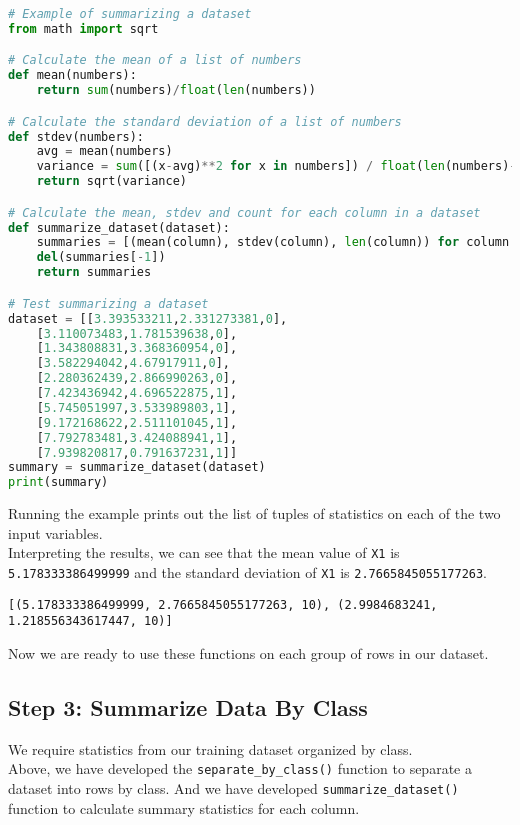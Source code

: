 \documentclass[12pt]{article}
\begin{document}
\begin{lstlisting}[language=python]
# Example of summarizing a dataset
from math import sqrt

# Calculate the mean of a list of numbers
def mean(numbers):
	return sum(numbers)/float(len(numbers))

# Calculate the standard deviation of a list of numbers
def stdev(numbers):
	avg = mean(numbers)
	variance = sum([(x-avg)**2 for x in numbers]) / float(len(numbers)-1)
	return sqrt(variance)

# Calculate the mean, stdev and count for each column in a dataset
def summarize_dataset(dataset):
	summaries = [(mean(column), stdev(column), len(column)) for column in zip(*dataset)]
	del(summaries[-1])
	return summaries

# Test summarizing a dataset
dataset = [[3.393533211,2.331273381,0],
	[3.110073483,1.781539638,0],
	[1.343808831,3.368360954,0],
	[3.582294042,4.67917911,0],
	[2.280362439,2.866990263,0],
	[7.423436942,4.696522875,1],
	[5.745051997,3.533989803,1],
	[9.172168622,2.511101045,1],
	[7.792783481,3.424088941,1],
	[7.939820817,0.791637231,1]]
summary = summarize_dataset(dataset)
print(summary)

\end{lstlisting}

Running the example prints out the list of tuples of statistics on each of the two input variables.\\

Interpreting the results, we can see that the mean value of \verb|X1| is \verb|5.178333386499999| and the standard deviation of \verb|X1| is \verb|2.7665845055177263|.

\begin{lstlisting}
[(5.178333386499999, 2.7665845055177263, 10), (2.9984683241, 1.218556343617447, 10)]

\end{lstlisting}

Now we are ready to use these functions on each group of rows in our dataset.

\newpage

\subsection{Step 3: Summarize Data By Class}

We require statistics from our training dataset organized by class.\\

Above, we have developed the \verb|separate_by_class()| function to separate a dataset into rows by class. And we have developed \verb|summarize_dataset()| function to calculate summary statistics for each column.\\
\end{document}
